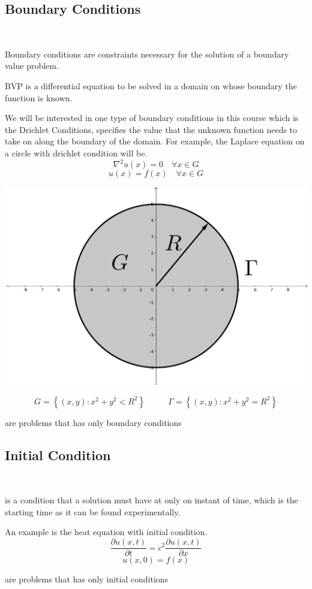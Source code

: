 \documentclass[]{article}
\begin{document}
\subsection{Boundary Conditions}
\
\begin{definition}
    Boundary conditions are constraints necessary for the solution of a boundary value problem.
\end{definition}
\begin{definition}
    BVP is a differential equation to be solved in a domain on whose boundary the function is known.
\end{definition}
We will be interested in one type of boundary conditions in this course which is the Drichlet Conditions, specifies the value that the unknown function needs to take on along the boundary of the domain. For example, the Laplace equation on a circle with drichlet condition will be.
\[
    \nabla^2 u(x) = 0 \quad \forall x \in G    
\]
\[
    u(x) = f(x) \quad \forall x \in G    
\]
\begin{center}
\includegraphics[scale=0.1]{laplacecircle.png} 
\end{center}
\[
    G = \left\lbrace (x,y):x^2+y^2 < R^2 \right\rbrace  \;\;\;\;\;\;\;\;\;\ \Gamma = \left\lbrace (x,y):x^2+y^2 = R^2 \right\rbrace    
\]
\begin{definition}
    are problems that has only boundary conditions
\end{definition}
\subsection{Initial Condition}
\
\begin{definition}
    is a condition that a solution must have at only on instant of time, which is the starting time as it can be found experimentally.
\end{definition}
An example is the heat equation with initial condition.
\[
    \frac{\partial u(x,t)}{\partial t}  = c^2 \frac{\partial u(x,t)}{\partial x}
\]
\[
    u(x,0) = f(x)
\]
\begin{definition}
    are problems that has only initial conditions
\end{definition}
\end{document}
